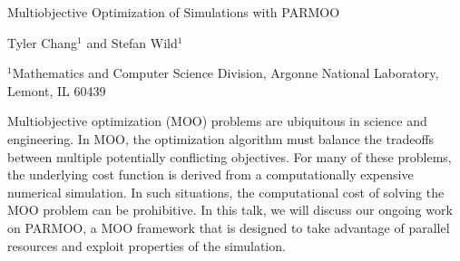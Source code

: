\documentclass[12pt]{article}
\begin{document}
Multiobjective Optimization of Simulations with PARMOO

Tyler Chang$^1$ and Stefan Wild$^1$

$^1$Mathematics and Computer Science Division, Argonne National Laboratory, Lemont, IL 60439

Multiobjective optimization (MOO) problems are ubiquitous in science and engineering.  In MOO, the optimization algorithm must balance the tradeoffs between multiple potentially conflicting objectives.  For many of these problems, the underlying cost function is derived from a computationally expensive numerical simulation.  In such situations, the computational cost of solving the MOO problem can be prohibitive.  In this talk, we will discuss our ongoing work on PARMOO, a MOO framework that is designed to take advantage of parallel resources and exploit properties of the simulation.
\end{document}
